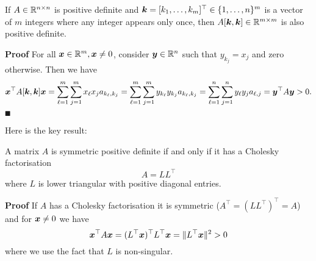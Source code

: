 \begin{lemma} If $A \in {\mathbb R}^{n \times n}$ is positive definite and $\bm{{\mbox{\boldmath$k$\unboldmath}}} = [k_1,\ldots,k_m]^\top \in \{1,\ldots,n\}^m$ is a vector of $m$ integers where any integer appears only once,  then $A[\bm{{\mbox{\boldmath$k$\unboldmath}}},\bm{{\mbox{\boldmath$k$\unboldmath}}}] \in {\mathbb R}^{m \times m}$ is also positive definite. \end{lemma}
\textbf{Proof} For all $\bm{{\mbox{\boldmath$x$\unboldmath}}} \in {\mathbb R}^m, \bm{{\mbox{\boldmath$x$\unboldmath}}} \neq 0$, consider $\bm{{\mbox{\boldmath$y$\unboldmath}}} \in {\mathbb R}^n$ such that $y_{k_j} = x_j$ and zero otherwise. Then we have
\[
\bm{{\mbox{\boldmath$x$\unboldmath}}}^\top A[\bm{{\mbox{\boldmath$k$\unboldmath}}},\bm{{\mbox{\boldmath$k$\unboldmath}}}] \bm{{\mbox{\boldmath$x$\unboldmath}}} = \sum_{\ell=1}^m \sum_{j=1}^m x_\ell x_j a_{k_\ell,k_j} = \sum_{\ell=1}^m \sum_{j=1}^m y_{k_\ell} y_{k_j} a_{k_\ell,k_j}  = \sum_{\ell=1}^n \sum_{j=1}^n y_\ell y_j a_{\ell,j} = \bm{{\mbox{\boldmath$y$\unboldmath}}}^\top A \bm{{\mbox{\boldmath$y$\unboldmath}}} > 0.
\]
\ensuremath{\QED}

Here is the key result:

\begin{theorem} A matrix $A$ is symmetric positive definite if and only if it has a Cholesky factorisation
\[
A = L L^\ensuremath{\top}
\]
where $L$ is lower triangular with positive diagonal entries.

\end{theorem}
\textbf{Proof} If $A$ has a Cholesky factorisation it is symmetric ($A^\ensuremath{\top} = (L L^\ensuremath{\top})^\ensuremath{\top} = A$) and for $\bm{{\mbox{\boldmath$x$\unboldmath}}} \neq 0$ we have
\[
\bm{{\mbox{\boldmath$x$\unboldmath}}}^\top A \bm{{\mbox{\boldmath$x$\unboldmath}}} = (L^\top\bm{{\mbox{\boldmath$x$\unboldmath}}})^\top L^\top \bm{{\mbox{\boldmath$x$\unboldmath}}} = \|L^\top\bm{{\mbox{\boldmath$x$\unboldmath}}}\|^2 > 0
\]
where we use the fact that $L$ is non-singular.

